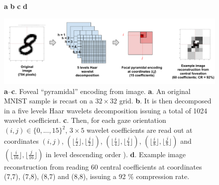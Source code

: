 \documentclass[12pt,twoside,openright]{article}
\begin{document}
\begin{figure}[b!]
	\centerline{
		\hspace{3cm}
		\textbf{a}
		\hspace{4cm}
		\textbf{b}	
		\hspace{4cm}
		\textbf{c}
		\hspace{4cm}
		\textbf{d}
		\hspace{3cm}			
	}
	\centerline{
		\includegraphics[width = \linewidth]{img/ICLR-foveated-model.pdf} 
	}
	
	\caption{\textbf{a}--\textbf{c}. Foveal ``pyramidal'' encoding from image. \textbf{a}. An original MNIST sample is recast on a $32\times32$ grid. \textbf{b}. It is then decomposed in a five levels Haar wavelets decomposition  issuing a total of 1024 wavelet coefficient. \textbf{c}. Then, for each gaze orientation $(i,j) \in \{0,...,15\}^2$, $3 \times 5$ wavelet coefficients are read out  at coordinates $(i,j)$, $(\lfloor\frac{i}{2}\rfloor,\lfloor\frac{j}{2}\rfloor)$,
	$(\lfloor\frac{i}{4}\rfloor,\lfloor\frac{j}{4}\rfloor)$,
	$(\lfloor\frac{i}{8}\rfloor,\lfloor\frac{j}{8}\rfloor)$	and
	$(\lfloor\frac{i}{16}\rfloor,\lfloor\frac{j}{16}\rfloor)$ in level descending order ).		
		\textbf{d}. Example image reconstruction from reading 60 central coefficients at coordinates (7,7), (7,8), (8,7) and (8,8), issuing a 92 \% compression rate.  
		}\label{fig:foveated}
\end{figure}
\end{document}
